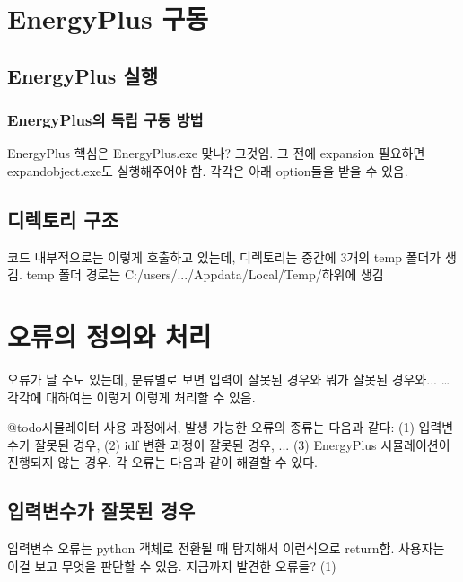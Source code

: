 
\section{EnergyPlus 구동}
\subsection{EnergyPlus 실행}
\subsubsection{EnergyPlus의 독립 구동 방법}
EnergyPlus 핵심은 EnergyPlus.exe 맞나? 그것임.
그 전에 expansion 필요하면 expandobject.exe도 실행해주어야 함.
각각은 아래 option들을 받을 수 있음.


\subsection{디렉토리 구조}
코드 내부적으로는 이렇게 호출하고 있는데,
디렉토리는 중간에 3개의 temp 폴더가 생김.
temp 폴더 경로는 C:/users/.../Appdata/Local/Temp/하위에 생김


\section{오류의 정의와 처리}
오류가 날 수도 있는데, 분류별로 보면 입력이 잘못된 경우와 뭐가 잘못된 경우와... \dots
각각에 대하여는 이렇게 이렇게 처리할 수 있음.

@todo시뮬레이터 사용 과정에서, 발생 가능한 오류의 종류는 다음과 같다: (1) 입력변수가 잘못된 경우, (2) idf 변환 과정이 잘못된 경우, ... (3) EnergyPlus 시뮬레이션이 진행되지 않는 경우.
각 오류는 다음과 같이 해결할 수 있다.


\subsection{입력변수가 잘못된 경우}
입력변수 오류는 python 객체로 전환될 때 탐지해서 이런식으로 return함. 사용자는 이걸 보고 무엇을 판단할 수 있음.
지금까지 발견한 오류들?
(1) 

